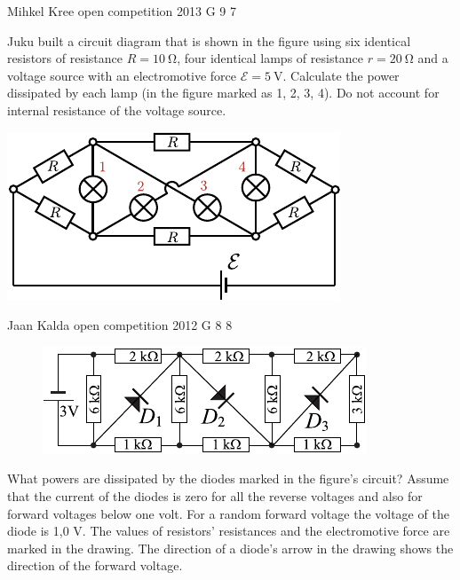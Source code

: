 \documentclass[11pt]{article}
\begin{document}
{Mihkel Kree} %
{open competition} %
{2013} %
{G 9} %
{7} %
{

\ifEngStatement
Juku built a circuit diagram that is shown in the figure using six identical resistors of resistance $R=\SI{10}{\ohm}$, four identical lamps of resistance $r=\SI{20}{\ohm}$ and a voltage source with an electromotive force $\mathcal{E}=\SI{5}{\volt}$. Calculate the power dissipated by each lamp (in the figure marked as 1, 2, 3, 4). Do not account for internal resistance of the voltage source.
\begin{center}
\includegraphics[width=0.6\linewidth]{2013-lahg-09-lambidJoonis-crop}
\end{center}
\fi
}

{Jaan Kalda} %
{open competition} %
{2012} %
{G 8} %
{8} %
{

\ifEngStatement
\begin{figure}
\includegraphics[width=\linewidth]{2012-lahg-08-dioodid}
\end{figure}
What powers are dissipated by the diodes marked in the figure’s circuit? Assume that the current of the diodes is zero for all the reverse voltages and also for forward voltages below one volt. For a random forward voltage the voltage of the diode is 1,0 V. The values of resistors’ resistances and the electromotive force are marked in the drawing. The direction of a diode’s arrow in the drawing shows the direction of the forward voltage.
\fi
}
\end{document}
